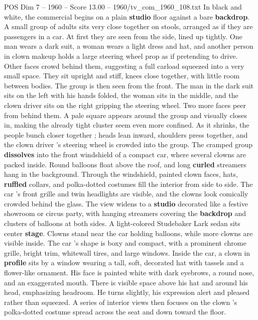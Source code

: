 \begin{textsample}{POS Dim 7 – 1960 – Score 13.00 – 1960/tv\_com\_1960\_108.txt}  \label{ex:f7_pos_025}
In black and white, the commercial begins on a plain \textbf{studio} floor against a bare \textbf{backdrop}.
A small group of adults sits very close together on stools, arranged as if they are passengers in a car.
At first they are seen from the side, lined up tightly.
One man wears a dark suit, a woman wears a light dress and hat, and another person in clown makeup holds a large steering wheel prop as if pretending to drive.
Other faces crowd behind them, suggesting a full carload squeezed into a very small space.
They sit upright and stiff, knees close together, with little room between bodies.
The group is then seen from the front.
The man in the dark suit sits on the left with his hands folded, the woman sits in the middle, and the clown driver sits on the right gripping the steering wheel.
Two more faces peer from behind them.
A pale square appears around the group and visually closes in, making the already tight cluster seem even more confined.
As it shrinks, the people bunch closer together ; heads lean inward, shoulders press together, and the clown driver ’s steering wheel is crowded into the group.
The cramped group \textbf{dissolves} into the front windshield of a compact car, where several clowns are packed inside.
Round balloons float above the roof, and long \textbf{curled} streamers hang in the background.
Through the windshield, painted clown faces, hats, \textbf{ruffled} collars, and polka-dotted costumes fill the interior from side to side.
The car ’s front grille and twin headlights are visible, and the clowns look comically crowded behind the glass.
The view widens to a \textbf{studio} decorated like a festive showroom or circus party, with hanging streamers covering the \textbf{backdrop} and clusters of balloons at both sides.
A light-colored Studebaker Lark sedan sits center \textbf{stage}.
Clowns stand near the car holding balloons, while more clowns are visible inside.
The car ’s shape is boxy and compact, with a prominent chrome grille, bright trim, whitewall tires, and large windows.
Inside the car, a clown in \textbf{profile} sits by a window wearing a tall, soft, decorated hat with tassels and a flower-like ornament.
His face is painted white with dark eyebrows, a round nose, and an exaggerated mouth.
There is visible space above his hat and around his head, emphasizing headroom.
He turns slightly, his expression alert and pleased rather than squeezed.
A series of interior views then focuses on the clown ’s polka-dotted costume spread across the seat and down toward the floor.

\end{textsample}
